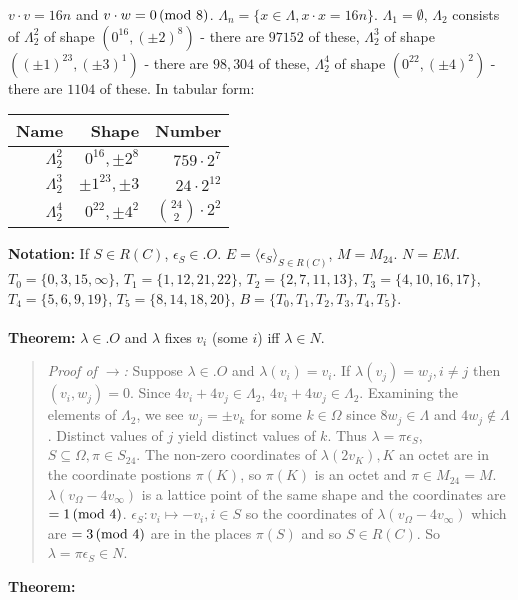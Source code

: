 $v \cdot v= 16n$ and $v \cdot w = 0 \thinspace \textnormal{(mod } 8 \textnormal{)}$.  
$\Lambda_n= \{ x  \in \Lambda, x \cdot x = 16n \}$.  $\Lambda_1 = \emptyset$,
$\Lambda_2$ consists of 
$\Lambda_2^2$ of shape $(0^{16}, (\pm 2)^8)$ - there are $97152$ of these,
$\Lambda_2^3$ of shape $((\pm 1)^{23}, (\pm 3)^1)$ - there are $98,304$ of these,
$\Lambda_2^4$ of shape $(0^{22}, (\pm 4)^2)$ - there are $1104$ of these.
In tabular form:
\begin{center}
\begin{tabular} {|r|r|r|}
\hline
{\bf Name} & {\bf Shape} & {\bf Number} \\
\hline
$\Lambda_2^2$ & $0^{16}, \pm 2^8$ & $759 \cdot 2^7$\\
\hline
$\Lambda_2^3$ & $\pm 1^{23}, \pm 3$ & $24 \cdot 2^{12}$\\
\hline
$\Lambda_2^4$ & $0^{22}, \pm 4^2$ & ${24 \choose 2} \cdot 2^2$\\
\hline
\end{tabular}
\end{center}
{\bf Notation:}
If $S \in R(C)$, $\epsilon_S \in .O$.
$E= \langle \epsilon_S \rangle_{S \in R(C)}$, $M= M_{24}$.  $N= EM$.
$T_0= \{0, 3, 15, \infty \}$,
$T_1= \{ 1,12,21,22 \}$,
$T_2= \{ 2,7,11,13 \}$,
$T_3= \{ 4,10,16,17 \}$,
$T_4= \{ 5,6,9,19 \}$,
$T_5= \{ 8, 14,18,20 \}$,
$B= \{ T_0, T_1, T_2, T_3, T_4, T_5 \}$.
\\
\\
{\bf Theorem:}
$\lambda \in .O$ and $\lambda$ fixes $v_i$ (some $i$) iff $\lambda \in N$.
\begin{quote}
\emph{Proof of $\rightarrow$:}
Suppose $\lambda \in .O$ and $\lambda(v_i)= v_i$.  If $\lambda(v_j)= w_j, i \ne j$ then
$(v_i, w_j)= 0$.  Since $4 v_i + 4 v_j \in \Lambda_2$,
$4 v_i + 4 w_j \in \Lambda_2$.  Examining the elements of $\Lambda_2$, we see
$w_j= \pm v_k$ for some $k \in \Omega$ since $8w_j \in \Lambda$ and $4w_j \notin \Lambda$.
Distinct values of $j$ yield distinct values of $k$.  Thus $\lambda= \pi \epsilon_S$,
$S \subseteq \Omega, \pi \in S_{24}$.  The non-zero coordinates of
$\lambda( 2 v_K ), K $ an octet are in the coordinate postions $\pi(K)$, so
$\pi(K)$ is an octet and  $\pi \in M_{24}=M$.  $\lambda( v_{\Omega} - 4 v_{\infty})$ is
a lattice point of the same shape and the coordinates are $=1 \thinspace \textnormal{(mod } 4 \textnormal{)}$.
$\epsilon_S: v_i \mapsto -v_i, i \in S$ so the coordinates of
$\lambda( v_{\Omega} - 4 v_{\infty})$ which are $= 3 \thinspace \textnormal{(mod } 4 \textnormal{)}$ are in the places
$\pi(S)$ and so $S \in R(C)$.  So $\lambda = \pi \epsilon_S \in N$.
\end{quote}
{\bf Theorem:}
